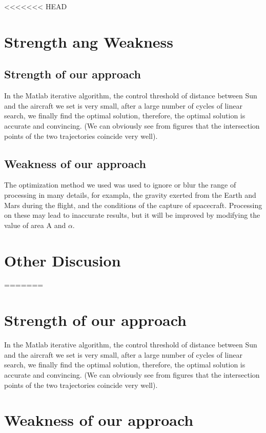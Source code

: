 \documentclass[../Paper.tex]{subfiles}
\begin{document}
<<<<<<< HEAD
\section{Strength ang Weakness}
\subsection{Strength of our approach}

In the Matlab iterative algorithm, the control threshold of distance between Sun and the aircraft we set is very small, after a large number of cycles of linear search, we finally find the optimal solution, therefore, the optimal solution is accurate and convincing. (We can obviously see from figures that the intersection points of the two trajectories coincide very well).

\subsection{Weakness of our approach}

The optimization method we used was used to ignore or blur the range of processing in many details, for exampla, the gravity exerted from the Earth and Mars during the flight, and the conditions of the capture of spacecraft. Processing on these may lead to inaccurate results, but it will be improved by modifying the value of area A and $\alpha$.

\section{Other Discusion}
=======
\section{Strength of our approach}

In the Matlab iterative algorithm, the control threshold of distance between Sun and the aircraft we set is very small, after a large number of cycles of linear search, we finally find the optimal solution, therefore, the optimal solution is accurate and convincing. (We can obviously see from figures that the intersection points of the two trajectories coincide very well).

\section{Weakness of our approach}

\end{document}
